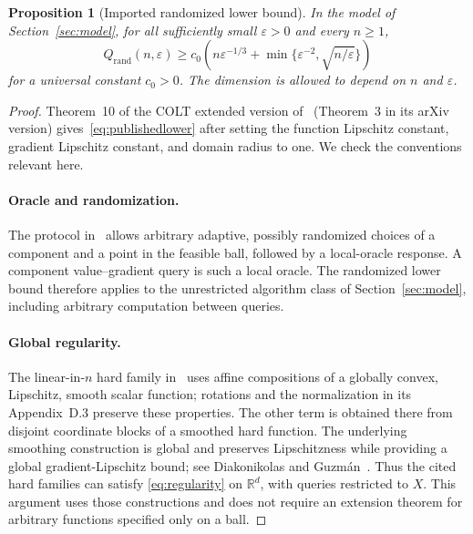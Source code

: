 \documentclass[11pt,a4paper]{article}
\newtheorem{proposition}[theorem]{Proposition}
\theoremstyle{definition}\newtheorem{definition}[theorem]{Definition}
\theoremstyle{remark}\newtheorem{remark}[theorem]{Remark}
\newcommand{\R}{\mathbb R}
\newcommand{\eps}{\varepsilon}
\newcommand{\Q}{Q_{\mathrm{rand}}}
\begin{document}
\begin{proposition}[Imported randomized lower bound]\label{prop:lower}
In the model of Section~\ref{sec:model}, for all sufficiently small
$\eps>0$ and every $n\ge1$,
\begin{equation}\label{eq:publishedlower}
 \Q(n,\eps)\ge
 c_0\left(n\eps^{-1/3}
       +\min\{\eps^{-2},\sqrt{n/\eps}\}\right)
\end{equation}
for a universal constant $c_0>0$. The dimension is allowed to depend on
$n$ and $\eps$.
\end{proposition}
\begin{proof}
Theorem~10 of the COLT extended version of~\cite{inside}
(Theorem~3 in its arXiv version) gives~\eqref{eq:publishedlower} after
setting the function Lipschitz constant, gradient Lipschitz constant,
and domain radius to one. We check the conventions relevant here.

\paragraph{Oracle and randomization.}
The protocol in~\cite[Section~5.1]{inside} allows arbitrary adaptive,
possibly randomized choices of a component and a point in the feasible
ball, followed by a local-oracle response. A component value--gradient
query is such a local oracle. The randomized lower bound therefore
applies to the unrestricted algorithm class of
Section~\ref{sec:model}, including arbitrary computation between queries.

\paragraph{Global regularity.}
The linear-in-$n$ hard family in~\cite[Section~5.3, equation~(12)]{inside}
uses affine compositions of a globally convex, Lipschitz, smooth scalar
function; rotations and the normalization in its Appendix~D.3 preserve
these properties. The other term is obtained there from disjoint
coordinate blocks of a smoothed hard function. The underlying smoothing
construction is global and preserves Lipschitzness while providing a
global gradient-Lipschitz bound; see
Diakonikolas and Guzm\'an~\cite[Theorem~14 and Appendix~A.3,
Proposition~19]{dg}. Thus the cited hard families can satisfy
\eqref{eq:regularity} on $\R^d$, with queries restricted to $X$.
This argument uses those constructions and does not require an extension
theorem for arbitrary functions specified only on a ball.


\end{proof}
\end{document}
